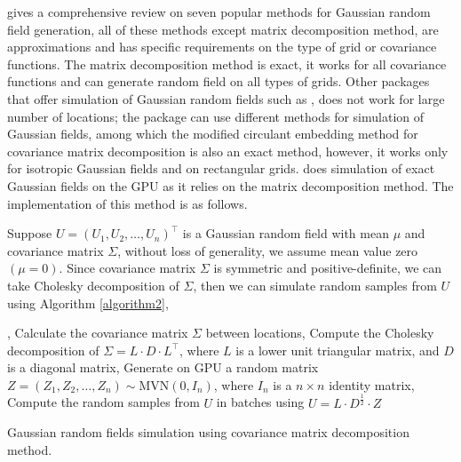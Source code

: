 \documentclass[article,nojss]{jss}\usepackage[]{graphicx}\usepackage[]{color}
\begin{document}
\cite{LiuandLi2019} gives a comprehensive review on seven popular methods for Gaussian random field generation, %
all of these methods except matrix decomposition method, are approximations and has specific requirements on the type of grid or covariance functions. The matrix decomposition method is exact, it works for all covariance functions and can generate random field on all types of grids. Other  packages that offer simulation of Gaussian random fields such as  \citep{geoR2001}, does not work for large number of locations; the  \citep{RandomFields2015,RandomFields2020} package can use different methods for simulation of Gaussian fields, among which the modified circulant embedding method \citep{Dietrich1997FastAE} for covariance matrix decomposition is also an exact method, however, it works only for isotropic Gaussian fields and on rectangular grids.  does simulation of exact Gaussian fields on the GPU as it relies on the matrix decomposition method. The implementation of this method is as follows.


Suppose $U=(U_1, U_2, \dots, U_n)^\top$ is a Gaussian random field with mean $\mu$ and covariance matrix $\Sigma$, without loss of generality, we assume mean value zero $(\mu = 0)$. Since covariance matrix $\Sigma$ is symmetric and positive-definite, we can take Cholesky decomposition of $\Sigma$, then we can simulate random samples from $U$ using Algorithm \ref{algorithm2},

\begin{algorithm}[H]
, Calculate the covariance matrix $\Sigma$ between locations, Compute the Cholesky decomposition of $\Sigma = L \cdot D \cdot L^\top$, where $L$ is a lower unit triangular matrix, and $D$ is a diagonal matrix, Generate on GPU a random matrix $Z=(Z_1, Z_2, \dots, Z_n) \sim \text{MVN}(0,I_n)$, where $I_n$ is a $n \times n$ identity matrix, Compute the random samples from $U$ in batches using $U = L \cdot D^{\frac{1}{2}} \cdot Z$ \;
 \caption{Gaussian random fields simulation using covariance matrix decomposition method.}
 \label{algorithm2}
\end{algorithm}
\end{document}
